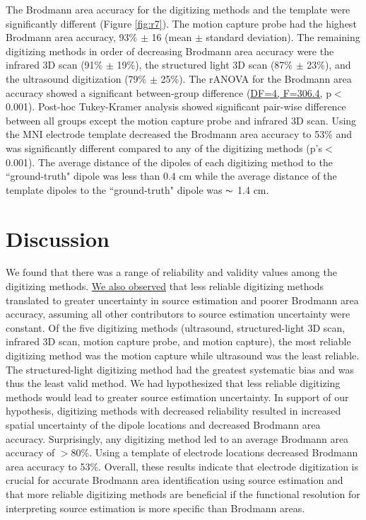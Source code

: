 \documentclass[../thesis_seyed.tex]{subfiles}
\begin{document}
The Brodmann area accuracy for the digitizing methods and the template were significantly different (Figure \ref{fig:r7}). The motion capture probe had the highest Brodmann area accuracy, 93\% $\pm$ 16 (mean $\pm$ standard deviation). The remaining digitizing methods in order of decreasing Brodmann area accuracy were the infrared 3D scan (91\% $\pm$ 19\%), the structured light 3D scan (87\% $\pm$ 23\%), and the ultrasound digitization (79\% $\pm$ 25\%). The rANOVA for the Brodmann area accuracy showed a significant between-group difference (\ul{DF=4, F=306.4,} p$<$0.001). Post-hoc Tukey-Kramer analysis showed significant pair-wise difference between all groups except the motion capture probe and infrared 3D scan. Using the MNI electrode template decreased the Brodmann area accuracy to 53\% and was significantly different compared to any of the digitizing methods (p's$<$0.001). The average distance of the dipoles of each digitizing method to the ``ground-truth" dipole was less than 0.4 cm while the average distance of the template dipoles to the ``ground-truth" dipole was $\thicksim$ 1.4 cm. 

\section{Discussion}

We found that there was a range of reliability and validity values among the digitizing methods. \ul{We also observed} that less reliable digitizing methods translated to greater uncertainty in source estimation and poorer Brodmann area accuracy, assuming all other contributors to source estimation uncertainty were constant. Of the five digitizing methods (ultrasound, structured-light 3D scan, infrared 3D scan, motion capture probe, and motion capture), the most reliable digitizing method was the motion capture while ultrasound was the least reliable. The structured-light digitizing method had the greatest systematic bias and was thus the least valid method. We had hypothesized that less reliable digitizing methods would lead to greater source estimation uncertainty. In support of our hypothesis, digitizing methods with decreased reliability resulted in increased spatial uncertainty of the dipole locations and decreased Brodmann area accuracy. Surprisingly, any digitizing method led to an average Brodmann area accuracy of $>$80\%. Using a template of electrode locations decreased Brodmann area accuracy to 53\%. Overall, these results indicate that electrode digitization is crucial for accurate Brodmann area identification using source estimation and that more reliable digitizing methods are beneficial if the functional resolution for interpreting source estimation is more specific than Brodmann areas.
\end{document}
